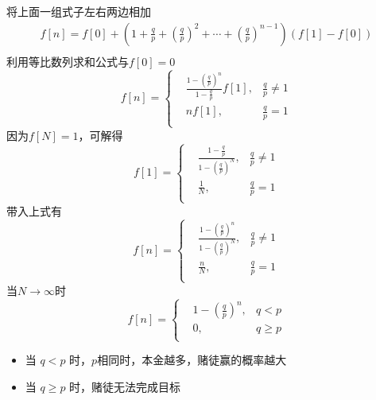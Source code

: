 \documentclass[
]{article}
\begin{document}
将上面一组式子左右两边相加\\
\begin{equation}
\begin{aligned}
f[n] = f[0]+(1 + \frac{q}{p} +  (\frac{q}{p})^{2} + \cdots +(\frac{q}{p})^{n-1})(f[1] - f[0])\\
\end{aligned}
\end{equation}
利用等比数列求和公式与$f[0]=0$\\
\begin{equation}
f[n] =\left\{
\begin{aligned}
&\frac{1-(\frac{q}{p})^n}{1-\frac{q}{p}} f[1], &\frac{q}{p} \neq 1 \\
&nf[1], &\frac{q}{p} = 1 \\
\end{aligned}
\right.
\end{equation}
因为$f[N]=1$，可解得\\
\begin{equation}
f[1] =\left\{
\begin{aligned}
&\frac{1-\frac{q}{p}}{1-(\frac{q}{p})^N}, &\frac{q}{p} \neq 1 \\
&\frac{1}{N}, &\frac{q}{p} = 1 \\
\end{aligned}
\right.
\end{equation}
带入上式有\\
\begin{equation}
f[n] =\left\{
\begin{aligned}
&\frac{1-(\frac{q}{p})^n}{1-(\frac{q}{p})^N}, &\frac{q}{p} \neq 1 \\
&\frac{n}{N}, &\frac{q}{p} = 1 \\
\end{aligned}
\right.
\end{equation}
当$N\to\infty$时\\
\begin{equation}
f[n] =\left\{
\begin{aligned}
&1-(\frac{q}{p})^n, & q<p\\
&0, & q \geq p \\
\end{aligned}
\right.
\end{equation}
\begin{itemize}
\item
  当 $q < p$ 时，$p$相同时，本金越多，赌徒赢的概率越大
\item
  当 $q \geq p$ 时，赌徒无法完成目标
\end{itemize}
\end{document}
